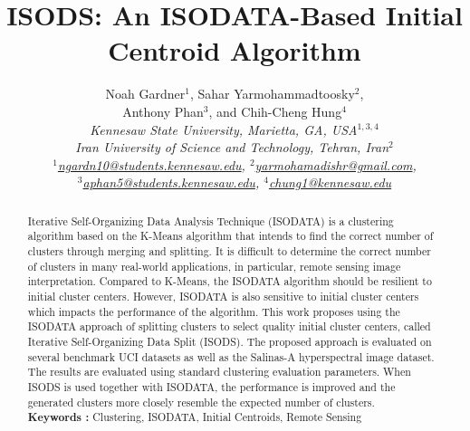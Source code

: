 \documentclass[a4paper, 10pt]{article}
\begin{document}
\title{\bf ISODS: An ISODATA-Based Initial Centroid Algorithm}
\author{
      Noah Gardner$^1$,
      Sahar Yarmohammadtoosky$^2$, \\
      Anthony Phan$^3$,
      and Chih-Cheng Hung$^4$\\[1ex]
      \sl \small Kennesaw State University, Marietta, GA, USA$^{1, 3, 4}$\\
      \sl \small Iran University of Science and Technology, Tehran,
      Iran$^2$\\[1ex]
      \small \href{mailto:ngardn10@students.kennesaw.edu}{$^1$ngardn10@students.kennesaw.edu},
      \small \href{mailto:yarmohamadishr@gmail.com}{$^2$yarmohamadishr@gmail.com}, \\
      \small \href{mailto:aphan5@students.kennesaw.edu}{$^3$aphan5@students.kennesaw.edu},
      \small \href{mailto:chung1@kennesaw.edu}{$^4$chung1@kennesaw.edu} \\
}
\date{}
\maketitle

\begin{abstract}
      \noindent 
      Iterative Self-Organizing Data Analysis Technique (ISODATA) is a
      clustering algorithm based on the K-Means algorithm that intends to find
      the correct number of clusters through merging and splitting. It is
      difficult to determine the correct number of clusters in many real-world
      applications, in particular, remote sensing image interpretation. Compared
      to K-Means, the ISODATA algorithm should be resilient to initial cluster
      centers. However, ISODATA is also sensitive to initial cluster centers
      which impacts the performance of the algorithm. This work proposes using
      the ISODATA approach of splitting clusters to select quality initial
      cluster centers, called Iterative Self-Organizing Data Split (ISODS). The
      proposed approach is evaluated on several benchmark UCI datasets as well
      as the Salinas-A hyperspectral image dataset. The results are evaluated
      using standard clustering evaluation parameters. When ISODS is used
      together with ISODATA, the performance is improved and the generated
      clusters more closely resemble the expected number of clusters.\\
      {\bf Keywords :} Clustering, ISODATA, Initial Centroids, Remote Sensing
\end{abstract}
\end{document}
